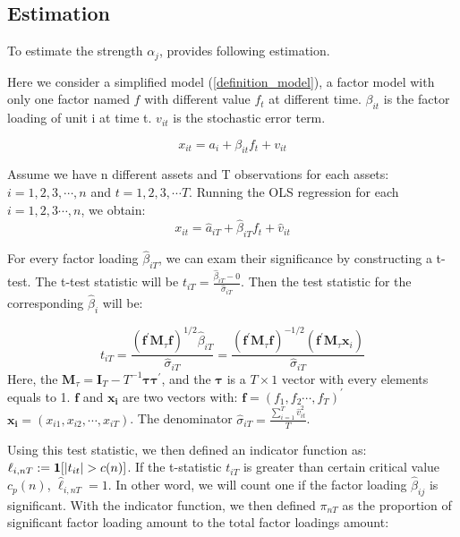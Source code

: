 \documentclass[12pt]{article}
\begin{document}
	\subsection{Estimation}\label{estimation}
To estimate the strength $\alpha_j$,  provides following estimation.

Here we consider a simplified model (\ref{definition_model}), a factor model with only one factor named $f$ with different value $f_t$ at different time. 
 $\beta_{it}$ is the factor loading of unit i at time t.
$v_{it}$ is the stochastic error term.

\[  x_{it} = a_{i} +  \beta_{it}f_{t} + v_{it} \tag{2} \label{estimation_model}\]

Assume we have n different assets and T observations for each assets: $i = 1, 2, 3, \cdots, n$ and $t = 1,2,3, \cdots T$.
Running the OLS regression for each $i = 1,2,3\cdots, n$, we obtain:
\[   x_{it} = \hat{a}_{iT} +  \hat{\beta}_{iT}f_{t} + \hat{v}_{it}  \]

For every factor loading $\hat{\beta}_{iT}$, we can exam their significance by constructing a t-test.
The t-test statistic will be $t_{iT} = \frac{\hat{\beta}_{iT} - 0}{\hat{\sigma}_{iT}}$.  
Then the test statistic for the corresponding $\hat{\beta}_i$ will be:

\[t_{i T}=\frac{\left(\mathbf{f}^{\prime} \mathbf{M}_{\tau} \mathbf{f}\right)^{1 / 2} \hat{\beta}_{i T}}{\hat{\sigma}_{i T}}=\frac{\left(\mathbf{f}^{\prime} \mathbf{M}_{\tau} \mathbf{f}\right)^{-1 / 2}\left(\mathbf{f}^{\prime} \mathbf{M}_{\tau} \mathbf{x}_{i}\right)}{\hat{\sigma}_{i T}} \tag{3} \label{test_statistic} \]
Here, the $\mathbf{M}_{\tau} = \mathbf{I}_T - T^{-1}\mathbf{\tau}\mathbf{\tau^\prime}$, and the $\mathbf{\tau}$ is a $T\times 1$ vector with every elements equals to 1.
$\mathbf{f}$ and $\mathbf{x_i}$ are two vectors with: $\mathbf{f} = (f_1, f_2 \cdots, f_T)^{\prime}$   $\mathbf{x_i} = (x_{i1}, x_{i2}, \cdots, x_{iT})$.
The denominator $\hat{\sigma}_{iT} = \frac{\sum_{i=1}^{T} \hat{v}^2_{it} }{T}$.

Using this test statistic, we then defined an  indicator function as: $\ell_{i,nT} := {\bf1}[|t_{it}|>c(n)]$.
If the t-statistic $t_{iT}$ is greater than certain critical value $c_p(n)$,  $\hat{\ell}_{i,nT} = 1$. 
In other word, we will count one if the factor loading $\hat{\beta}_{ij}$ is significant. 
With the indicator function, we then defined $\pi_{nT}$ as the proportion of significant factor loading amount to the total factor loadings amount:
\end{document}
